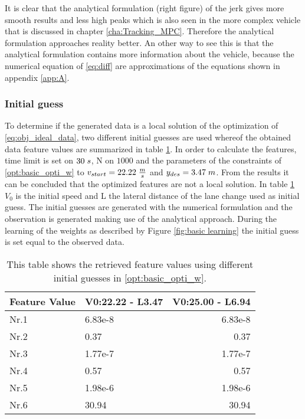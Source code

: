 It is clear that the analytical formulation (right figure)  of the jerk gives more smooth results and less high peaks which is also seen in the more complex vehicle that is discussed in chapter \ref{cha:Tracking_MPC}. Therefore the analytical formulation approaches reality better. An other way to see this is that the analytical formulation contains more information about the vehicle, because the numerical equation of \ref{eq:diff} are approximations of the equations shown in appendix \ref{app:A}. 

\subsubsection{Initial guess}

To determine if the generated data is a local solution of the optimization of \ref{eq:obj_ideal_data}, two different initial guesses are used whereof the obtained data feature values are summarized in table \ref{tab:GD_local_test}. In order to calculate the features, time limit is set on $30\hspace{1mm}s$, N on $1000$ and the parameters of the constraints of \ref{opt:basic_opti_w} to $v_{start} = 22.22\hspace{1mm}\frac{m}{s}$ and $y_{des} = 3.47\hspace{1mm}m$. From the results it can be concluded that the optimized features are not a local solution. In table \ref{tab:GD_local_test}  $V_0$ is the initial speed and L the lateral distance of the lane change used as initial guess. The initial guesses are generated with the numerical formulation and the observation is generated making use of the analytical approach. During the learning of the weights as described by Figure \ref{fig:basic learning} the initial guess is set equal to the observed data. 

\begin{table}[h!]
	\centering
	\begin{tabular}{@{}llr@{}} \toprule
		\textbf{Feature Value}     & V0:22.22 - L3.47 & V0:25.00 - L6.94\\ \midrule
		Nr.1       & 6.83e-8   & 6.83e-8 \\
		Nr.2       & 0.37        & 0.37  \\
		Nr.3       & 1.77e-7     & 1.77e-7 \\
		Nr.4       & 0.57    & 0.57  \\
		Nr.5       & 1.98e-6     & 1.98e-6 \\
		Nr.6       & 30.94      & 30.94\\ \bottomrule
	\end{tabular}
	\caption{This table shows the retrieved feature values using different initial guesses in \ref{opt:basic_opti_w}.}
	\label{tab:GD_local_test}
\end{table}

